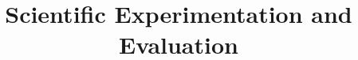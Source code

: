 \documentclass[conference]{IEEEtran}
\begin{document}
\title{Scientific Experimentation and Evaluation}

\author{
\\
}

\maketitle



\newpage

\newpage

\newpage


\newpage

\newpage

\end{document}
